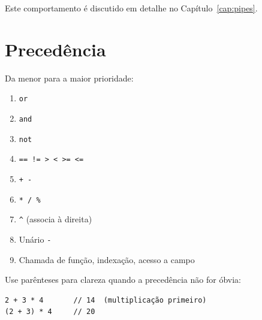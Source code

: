 Este comportamento é discutido em detalhe no Capítulo~\ref{cap:pipes}.

\section{Precedência}

Da menor para a maior prioridade:

\begin{enumerate}
  \item \texttt{or}
  \item \texttt{and}
  \item \texttt{not}
  \item \texttt{== != > < >= <=}
  \item \texttt{+ -}
  \item \texttt{* / \%}
  \item \texttt{\^} (associa à direita)
  \item Unário \texttt{-}
  \item Chamada de função, indexação, acesso a campo
\end{enumerate}

Use parênteses para clareza quando a precedência não for óbvia:

\begin{lstlisting}
2 + 3 * 4       // 14  (multiplicação primeiro)
(2 + 3) * 4     // 20
\end{lstlisting}
